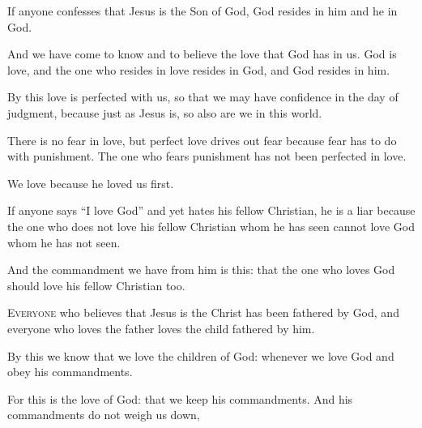 \begin{scripture}
 If anyone confesses that Jesus is the Son of God, God resides in him and he in God.
 And we have come to know and to believe the love that God has in us. God is love, and the one who resides in love resides in God, and God resides in him.
 By this love is perfected with us, so that we may have confidence in the day of judgment, because just as Jesus is, so also are we in this world.
 There is no fear in love, but perfect love drives out fear because fear has to do with punishment. The one who fears punishment has not been perfected in love.
 We love because he loved us first.
\everypar{}

 If anyone says ``I love God'' and yet hates his fellow Christian, he is a liar because the one who does not love his fellow Christian whom he has seen cannot love God whom he has not seen.
 And the commandment we have from him is this: that the one who loves God should love his fellow Christian too.

 \allowchapbreak\hypertarget{ch-1john-5}{}\lettrine[lines=5]{\color{general}E}{\textsc{veryone}} who believes that Jesus is the Christ has been fathered by God, and everyone who loves the father loves the child fathered by him.\everypar{}
 By this we know that we love the children of God: whenever we love God and obey his commandments.
 For this is the love of God: that we keep his commandments. And his commandments do not weigh us down,
\everypar{}


\end{scripture}
